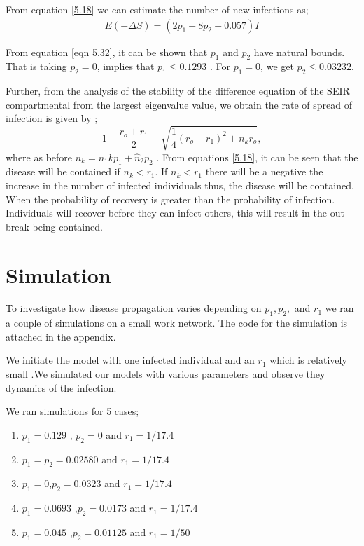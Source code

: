  From equation \ref{5.18} we can estimate the number of new infections as;
\begin{align}
E(- \Delta S) = (2 p_1 + 8 p_2 - 0.057) I  \label{5.1.9}
\end{align}
 
From equation \ref{eqn 5.32}, it can be shown that $p_1$ and $p_2$ have natural bounds. That is taking $p_2 = 0$, implies that $p_1 \leq 0.1293$ . For $p_1 = 0$, we get $p_2 \leq 0.03232$.

Further, from the analysis of the stability of the difference equation of the SEIR compartmental from the largest eigenvalue value, we obtain  the rate of spread of infection is given by ;
\begin{equation}
1- \dfrac{r_o + r_1}{2} + \sqrt{\dfrac{1}{4}(r_o - r_1)^2 + n_k r_o} \label{eqn 5.3.10},
\end{equation}
where as before $n_k = n_1kp_1 + \widehat{n}_2 p_2$ \citep{fu2013propagation}.
From equations \ref{5.18}, it can be seen that the disease will be contained if $n_k < r_1$. If $n_k < r_1$ there will be a negative the increase in the number of infected individuals thus, the disease will be contained. When the probability of recovery is greater than the probability of infection. Individuals will recover before they can infect others, this will result in the out break being contained.

\section{Simulation}
To investigate how disease propagation varies depending on $p_1, p_2, $ and $r_1$ we ran a couple of simulations on a small work network. The code for the simulation is attached in the appendix. 

We initiate the model with one infected individual and an $r_1$ which is relatively small .We simulated our models with various parameters and observe they dynamics  of the infection. 

We ran simulations for 5 cases;
\begin{enumerate}
\item $p_1 = 0.129$ , $p_2 =0$ and $r_1 = 1/17.4$
\item $p_1 = p_2 = 0.02580$ and $r_1 = 1/17.4$ 
\item $p_1 =0 $,$p_2 = 0.0323$ and $r_1 = 1/17.4$
\item $p_1 = 0.0693$ ,$p_2 = 0.0173$ and $r_1 = 1/17.4$
\item $p_1 = 0.045$ ,$p_2 = 0.01125$ and $r_1 = 1/50$
\end{enumerate}

